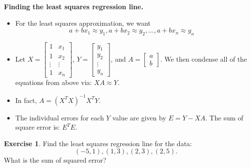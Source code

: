 \documentclass[handout]{beamer}
\newcommand{\fn}{\insertframenumber}
\theoremstyle{definition}
\newtheorem{exercise}{Exercise}
\begin{document}
\begin{frame}{\fn}
\begin{block}{\textbf{Finding the least squares regression line.}}
	\begin{itemize}[label=--]
		\item For the least squares approximation, we want 
		\[a+bx_1\approx y_1,a+bx_2\approx y_2,\dots,a+bx_n\approx y_n\]
		\item Let $X=\begin{bmatrix}
		1&x_1\\1&x_2\\\vdots&\vdots\\1&x_n
		\end{bmatrix}$, $Y=\begin{bmatrix}y_1\\y_2\\\vdots\\y_n\end{bmatrix}$, and $A=\begin{bmatrix}a\\b\end{bmatrix}$.
		We then condense all of the equations from above via:
		$XA\approx Y.$
		\item In fact, $A=(X^TX)^{-1}X^TY$.
		\item The individual errors for each $Y$ value are given by $E=Y-XA$.  The sum of square error is: $E^TE$.
	\end{itemize}
\end{block}
\end{frame}
\begin{frame}{\fn}
\begin{exercise}
	Find the least squares regression line for the data:
	\[(-5,1),(1,3),(2,3),(2,5).\]
	What is the sum of squared error?
\end{exercise}
\end{frame}
\end{document}
